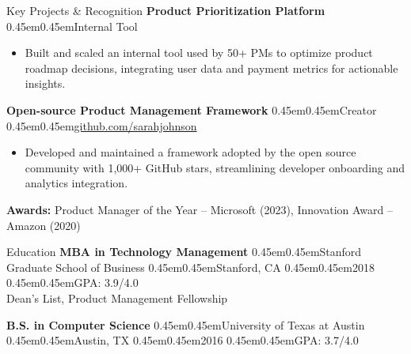 \documentclass[10pt, letterpaper]{article}
\makeatletter
\renewcommand{\section}{%
  \@startsection{section}{1}{\z@}{10pt}{6pt}{%
    \Large\bfseries\color{black}%
  }%
}
\newcommand{\bull}{\kern0.45em\textbullet\kern0.45em}
\newcommand{\org}[1]{\textbf{#1}}
\makeatother
\begin{document}
\section{Key Projects \& Recognition}
\org{Product Prioritization Platform} \bull Internal Tool \\
\begin{itemize}
  \item Built and scaled an internal tool used by 50+ PMs to optimize product roadmap decisions, integrating user data and payment metrics for actionable insights.
\end{itemize}
\vspace{3pt}
\org{Open-source Product Management Framework} \bull Creator \bull \href{https://github.com/sarahjohnson}{github.com/sarahjohnson} \\
\begin{itemize}
  \item Developed and maintained a framework adopted by the open source community with 1,000+ GitHub stars, streamlining developer onboarding and analytics integration.
\end{itemize}
\vspace{3pt}
\textbf{Awards:} Product Manager of the Year -- Microsoft (2023), Innovation Award -- Amazon (2020)

\section{Education}
\textbf{MBA in Technology Management} \bull Stanford Graduate School of Business \bull Stanford, CA \bull 2018 \bull GPA: 3.9/4.0 \\
Dean's List, Product Management Fellowship

\vspace{6pt}
\textbf{B.S. in Computer Science} \bull University of Texas at Austin \bull Austin, TX \bull 2016 \bull GPA: 3.7/4.0
\end{document}
